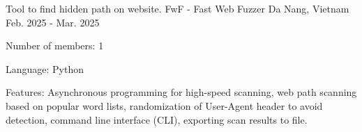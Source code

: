 

\begin{cventries}

  \cventry
    {Tool to find hidden path on website.} %
    {FwF - Fast Web Fuzzer} %
    {Da Nang, Vietnam} %
    {Feb. 2025 - Mar. 2025} %
    {
      \begin{cvitems} %
        \item {Number of members: 1}
        \item {Language: Python}
        \item {Features: Asynchronous programming for high-speed scanning, web path
scanning based on popular word lists, randomization of User-Agent header to
avoid detection, command line interface (CLI), exporting scan results to file.}
      \end{cvitems}
    }
    
\end{cventries}
